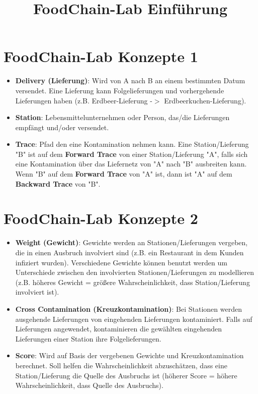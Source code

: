 \documentclass{beamer}
\title{FoodChain-Lab Einführung}
\date{}
\begin{document}
\maketitle

\section{FoodChain-Lab Konzepte 1}
\begin{frame}
	\begin{itemize}
		\item \textbf{Delivery (Lieferung)}: Wird von A nach B an einem bestimmten Datum versendet. Eine Lieferung kann Folgelieferungen und vorhergehende Lieferungen haben (z.B. Erdbeer-Lieferung -$>$ Erdbeerkuchen-Lieferung).
		\item \textbf{Station}: Lebensmittelunternehmen oder Person, das/die Lieferungen empfängt und/oder versendet.
		\item \textbf{Trace}: Pfad den eine Kontamination nehmen kann. Eine Station/Lieferung "B" ist auf dem \textbf{Forward Trace} von einer Station/Lieferung "A", falls sich eine Kontamination über das Liefernetz von "A" nach "B" ausbreiten kann. Wenn "B" auf dem \textbf{Forward Trace} von "A" ist, dann ist "A" auf dem \textbf{Backward Trace} von "B".
	\end{itemize}
\end{frame}

\section{FoodChain-Lab Konzepte 2}
\begin{frame}
	\begin{itemize}
		\item \textbf{Weight (Gewicht)}: Gewichte werden an Stationen/Lieferungen vergeben, die in einen Ausbruch involviert sind (z.B. ein Restaurant in dem Kunden infiziert wurden). Verschiedene Gewichte können benutzt werden um Unterschiede zwischen den involvierten Stationen/Lieferungen zu modellieren (z.B. höheres Gewicht = größere Wahrscheinlichkeit, dass Station/Lieferung involviert ist).
		\item \textbf{Cross Contamination (Kreuzkontamination)}: Bei Stationen werden ausgehende Lieferungen von eingehenden Lieferungen kontaminiert. Falls auf Lieferungen angewendet, kontaminieren die gewählten eingehenden Lieferungen einer Station ihre Folgelieferungen.
		\item \textbf{Score}: Wird auf Basis der vergebenen Gewichte und Kreuzkontamination berechnet. Soll helfen die Wahrscheinlichkeit abzuschätzen, dass eine Station/Lieferung die Quelle des Ausbruchs ist (höherer Score = höhere Wahrscheinlichkeit, dass Quelle des Ausbruchs).
	\end{itemize}
\end{frame}
\end{document}
